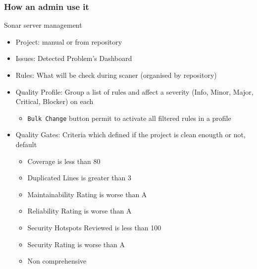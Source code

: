 \subsubsection{How an admin use it}
\begin{frame}[fragile]{\subsubsecname}
  Sonar server management
  \begin{itemize}
    \item Project: manual or from repository
    \item Issues: Detected Problem's Dashboard
    \item Rules: What will be check during scaner (organised by repository)
    \item Quality Profile: Group a list of rules and affect a severity (Info, Minor, Major, Critical, Blocker) on each
    \begin{itemize}
      \item \texttt{Bulk Change} button permit to activate all filtered rules in a profile
    \end{itemize}
    \item Quality Gates: Criteria which defined if the project is clean enougth or not, default
    \begin{itemize}
      \item Coverage is less than 80%
      \item Duplicated Lines is greater than 3%
      \item Maintainability Rating is worse than A
      \item Reliability Rating is worse than A
      \item Security Hotspots Reviewed is less than 100%
      \item Security Rating is worse than A
      \item Non comprehensive
    \end{itemize}
  \end{itemize}
\end{frame}
